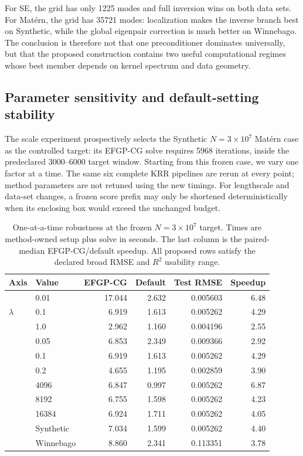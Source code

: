 For SE, the grid has only 1225 modes and full inversion wins on both data
sets.  For Mat\'ern, the grid has 35721 modes: localization makes the inverse
branch best on Synthetic, while the global eigenpair correction is much
better on Winnebago.  The conclusion is therefore not that one
preconditioner dominates universally, but that the proposed construction
contains two useful computational regimes whose best member depends on
kernel spectrum and data geometry.

\iffalse
\subsection{Parameter sensitivity and default-setting stability}
\label{subsec:formal-robustness}

The scale experiment prospectively selects the Synthetic
\(N=3\times10^7\) Mat\'ern case as the controlled target: its EFGP-CG solve
requires 5968 iterations, inside the predeclared 3000--6000 target window.
Starting from this frozen case, we vary one factor at a time.  The same six
complete KRR pipelines are rerun at every point; method parameters are not
retuned using the new timings.  For lengthscale and data-set changes, a frozen
score prefix may only be shortened deterministically when its enclosing box
would exceed the unchanged budget.

\begin{table}[H]
\centering
\footnotesize
\setlength{\tabcolsep}{4.2pt}
\caption{One-at-a-time robustness at the frozen \(N=3\times10^7\) target.
Times are method-owned setup plus solve in seconds.  The last column is the
paired-median EFGP-CG/default speedup.  All proposed rows satisfy the declared
broad RMSE and \(R^2\) usability range.}
\label{tab:formal-robustness}
\begin{tabular}{llrrrr}
\toprule
Axis & Value & EFGP-CG & Default & Test RMSE & Speedup \\
\midrule
\multirow{3}{*}{\(\lambda\)}
& 0.01 & 17.044 & 2.632 & 0.005603 & 6.48 \\
& 0.1  &  6.919 & 1.613 & 0.005262 & 4.29 \\
& 1.0  &  2.962 & 1.160 & 0.004196 & 2.55 \\
\addlinespace[1pt]
\multirow{3}{*}{\(\ell\)}
& 0.05 & 6.853 & 2.349 & 0.009366 & 2.92 \\
& 0.1  & 6.919 & 1.613 & 0.005262 & 4.29 \\
& 0.2  & 4.655 & 1.195 & 0.002859 & 3.90 \\
\addlinespace[1pt]
\multirow{3}{*}{Box budget}
& 4096  & 6.847 & 0.997 & 0.005262 & 6.87 \\
& 8192  & 6.755 & 1.598 & 0.005262 & 4.23 \\
& 16384 & 6.924 & 1.711 & 0.005262 & 4.05 \\
\addlinespace[1pt]
\multirow{2}{*}{Data}
& Synthetic & 7.034 & 1.599 & 0.005262 & 4.40 \\
& Winnebago & 8.860 & 2.341 & 0.113351 & 3.78 \\
\bottomrule
\end{tabular}
\end{table}

